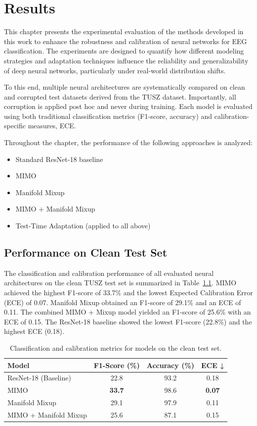 \chapter{Results}
\label{ch:results}
This chapter presents the experimental evaluation of the methods developed in this work to enhance the robustness and calibration of neural networks for EEG classification. The experiments are designed to quantify how different modeling strategies and adaptation techniques influence the reliability and generalizability of deep neural networks, particularly under real-world distribution shifts.

To this end, multiple neural architectures are systematically compared on clean and corrupted test datasets derived from the TUSZ dataset. Importantly, all corruption is applied post hoc and never during training. Each model is evaluated using both traditional classification metrics (F1-score, accuracy) and calibration-specific measures, ECE.

Throughout the chapter, the performance of the following approaches is analyzed:
\begin{itemize}
    \item Standard ResNet-18 baseline
    \item MIMO
    \item Manifold Mixup
    \item MIMO + Manifold Mixup
    \item Test-Time Adaptation (applied to all above)
\end{itemize}


\section{Performance on Clean Test Set}
The classification and calibration performance of all evaluated neural architectures on the clean TUSZ test set is summarized in Table~\ref{tab:clean_results}. MIMO achieved the highest F1-score of 33.7\% and the lowest Expected Calibration Error (ECE) of 0.07. Manifold Mixup obtained an F1-score of 29.1\% and an ECE of 0.11. The combined MIMO + Mixup model yielded an F1-score of 25.6\% with an ECE of 0.15. The ResNet-18 baseline showed the lowest F1-score (22.8\%) and the highest ECE (0.18).

\begin{table}[h]
\centering
\begin{tabular}{lccc}
\toprule
Model & F1-Score (\%) & Accuracy (\%) & ECE ↓ \\
\midrule
ResNet-18 (Baseline) & 22.8 & 93.2 & 0.18 \\
MIMO & \textbf{33.7} & 98.6 & \textbf{0.07} \\
Manifold Mixup & 29.1 & 97.9 & 0.11 \\
MIMO + Manifold Mixup & 25.6 & 87.1 & 0.15 \\
\bottomrule
\end{tabular}
\caption{Classification and calibration metrics for models on the clean test set.}
\label{tab:clean_results}
\end{table}

